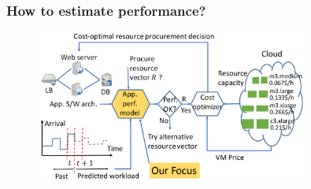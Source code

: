 \documentclass{beamer}
\begin{document}
\begin{frame}
\frametitle{How to estimate performance?}
\begin{figure}[htbp]
\centering
\includegraphics[width=0.8\textwidth]{system}
\end{figure}
\end{frame}

\end{document}
